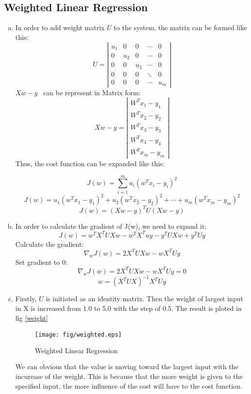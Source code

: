 \documentclass[a4paper, 12pt, titlepage]{article}
\begin{document}
\begin{enumerate}[(a)]
            


\section{Weighted Linear Regression}
\begin{enumerate}[(a)]
    \item In order to add weight matrix $U$ to the system, the matrix can be formed like this:
    \[ U = 
    \left| 
    {\begin{array}{ccccc}
    u_1 & 0 & 0 & \cdots & 0 \\
    0   & u_2 & 0 & \cdots & 0 \\
    0   & 0 & u_3 & \cdots & 0 \\
    0   & 0 & 0 & \ddots & 0 \\
    0   & 0 & 0 & \cdots & u_m
    \end{array}}
    \right|
\]
$Xw-y$~ can be represent in Matrix form:
\[Xw-y=
\left|
{\begin{array}{c}
    W^Tx_1-y_1\\
    W^Tx_2-y_2\\
    W^Tx_3-y_3\\
    W^Tx_4-y_4\\
    W^Tx_m-y_m
\end{array}}
\right|
\]
Thus, the cost function can be expanded like this:

$$J(w)=\sum_{i=1}^mu_i(w^Tx_i-y_i)^2 $$
$$J(w)=u_1(w^Tx_1-y_1)^2+u_2(w^Tx_2-y_2)^2+\cdots+u_m(w^Tx_m-y_m)^2$$
$$J(w)=(Xw-y)^TU(Xw-y)$$
    \item In order to calculate the gradient of J(w), we need to expand it:
        $$J(w)=w^TX^TUXw-w^TX^Tuy-y^TUXw+y^TUy$$
        Calculate the gradient:
        $$\nabla_wJ(w)=2X^TUXw-wX^TUy$$
        Set gradient to 0:
        $$\nabla_wJ(w)=2X^TUXw-wX^TUy=0$$
        $$w=(X^TUX)^{-1}X^TUy$$

    \item Firstly, $U$ is initiated as an identity matrix. Then the weight of largest input in X is increased from 1.0 to 5.0 with the step of 0.5. The result is ploted in fig \ref{weight}
            \begin{figure}[H]
                \centering
                \texttt{[image: fig/weighted.eps]}
                \caption{Weighted Linear Regression}\label{weighted}
            \end{figure}

            We can obvious that the value is moving toward the largest input with the incurease of the weight. This is because that the more weight is given to the specified input, the more influence of the cost will have to the cost function. 


\end{enumerate}
\end{enumerate}
\end{document}
